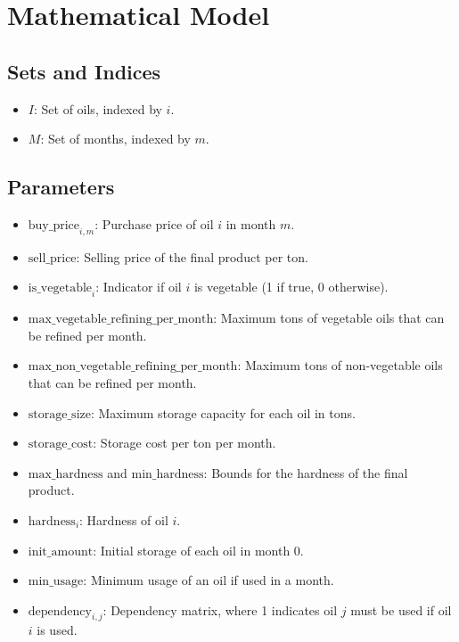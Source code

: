 \documentclass{article}
\begin{document}
\section*{Mathematical Model}

\subsection*{Sets and Indices}
\begin{itemize}
    \item \( I \): Set of oils, indexed by \( i \).
    \item \( M \): Set of months, indexed by \( m \).
\end{itemize}

\subsection*{Parameters}
\begin{itemize}
    \item \( \text{buy\_price}_{i,m} \): Purchase price of oil \( i \) in month \( m \).
    \item \( \text{sell\_price} \): Selling price of the final product per ton.
    \item \( \text{is\_vegetable}_i \): Indicator if oil \( i \) is vegetable (1 if true, 0 otherwise).
    \item \( \text{max\_vegetable\_refining\_per\_month} \): Maximum tons of vegetable oils that can be refined per month.
    \item \( \text{max\_non\_vegetable\_refining\_per\_month} \): Maximum tons of non-vegetable oils that can be refined per month.
    \item \( \text{storage\_size} \): Maximum storage capacity for each oil in tons.
    \item \( \text{storage\_cost} \): Storage cost per ton per month.
    \item \( \text{max\_hardness} \) and \( \text{min\_hardness} \): Bounds for the hardness of the final product.
    \item \( \text{hardness}_i \): Hardness of oil \( i \).
    \item \( \text{init\_amount} \): Initial storage of each oil in month 0.
    \item \( \text{min\_usage} \): Minimum usage of an oil if used in a month.
    \item \( \text{dependency}_{i,j} \): Dependency matrix, where 1 indicates oil \( j \) must be used if oil \( i \) is used.
\end{itemize}
\end{document}
